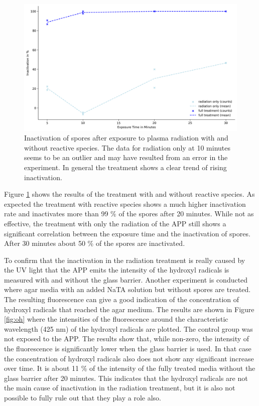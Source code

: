 \begin{figure}
    \centering
    \includegraphics[width=.8\textwidth]{images/Treatment.png}
    \caption[Inactivation of spores after exposure to plasma]{Inactivation of spores after exposure to plasma radiation with and without reactive species. The data for radiation only at 10 minutes seems to be an outlier and may have resulted from an error in the experiment. In general the treatment shows a clear trend of rising inactivation.}
    \label{fig:treatment}
\end{figure}

Figure \ref{fig:treatment} shows the results of the treatment with and without reactive species. As expected the treatment with reactive species shows a much higher inactivation rate and inactivates more than 99 \% of the spores after 20 minutes. While not as effective, the treatment with only the radiation of the APP still shows a significant correlation between the exposure time and the inactivation of spores. After 30 minutes about 50 \% of the spores are inactivated.

To confirm that the inactivation in the radiation treatment is really caused by the UV light that the APP emits the intensity of the hydroxyl radicals is measured with and without the glass barrier. Another experiment is conducted where agar media with an added NaTA solution but without spores are treated. The resulting fluorescence can give a good indication of the concentration of hydroxyl radicals that reached the agar medium. The results are shown in Figure \ref{fig:oh} where the intensities of the fluorescence around the characteristic wavelength (425 nm) of the hydroxyl radicals are plotted. The control group was not exposed to the APP. The results show that, while non-zero, the intensity of the fluorescence is significantly lower when the glass barrier is used. In that case the concentration of hydroxyl radicals also does not show any significant increase over time. It is about 11 \% of the intensity of the fully treated media without the glass barrier after 20 minutes. This indicates that the hydroxyl radicals are not the main cause of inactivation in the radiation treatment, but it is also not possible to fully rule out that they play a role also.


